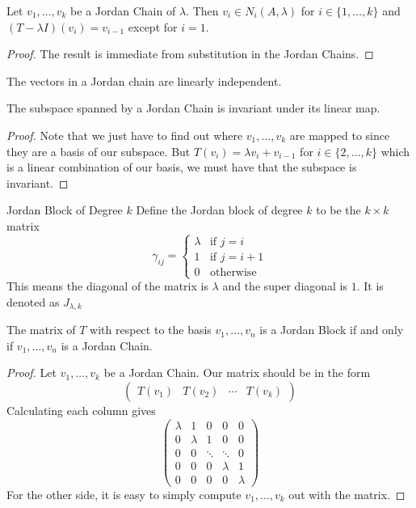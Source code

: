 \begin{crl}{}{} Let $v_1,\dots,v_k$ be a Jordan Chain of $\lambda$. Then $v_i\in N_i(A,\lambda)$ for $i\in\{1,\dots,k\}$ and $(T-\lambda I)(v_i)=v_{i-1}$ except for $i=1$. \tcbline
\begin{proof} The result is immediate from substitution in the Jordan Chains. 
\end{proof}
\end{crl}

\begin{prp}{}{} The vectors in a Jordan chain are linearly independent. 
\end{prp}

\begin{prp}{}{} The subspace spanned by a Jordan Chain is invariant under its linear map. \tcbline
\begin{proof} Note that we just have to find out where $v_1,\dots,v_k$ are mapped to since they are a basis of our subspace. But $T(v_i)=\lambda v_i+v_{i-1}$ for $i\in\{2,\dots,k\}$ which is a linear combination of our basis, we must have that the subspace is invariant. 
\end{proof}
\end{prp}

\begin{defn}{Jordan Block of Degree $k$}{} Define the Jordan block of degree $k$ to be the $k\times k$ matrix $$
\gamma_{ij}=\begin{cases}
\lambda & \text{if $j=i$}\\
1 & \text{if $j=i+1$}\\
0 & \text{otherwise}
\end{cases}$$
This means the diagonal of the matrix is $\lambda$ and the super diagonal is $1$. It is denoted as $J_{\lambda,k}$
\end{defn}

\begin{crl}{}{} The matrix of $T$ with respect to the basis $v_1,\dots,v_n$ is a Jordan Block if and only if $v_1,\dots,v_n$ is a Jordan Chain. \tcbline
\begin{proof} Let $v_1,\dots,v_k$ be a Jordan Chain. Our matrix should be in the form $$\begin{pmatrix}
T(v_1) & T(v_2) & \cdots & T(v_k) 
\end{pmatrix}$$ Calculating each column gives $$\begin{pmatrix}
\lambda & 1 & 0 & 0 & 0\\
0 & \lambda & 1 & 0 & 0\\
0 & 0 & \ddots & \ddots & 0\\
0 & 0 & 0 & \lambda & 1\\
0 & 0 & 0 & 0 & \lambda
\end{pmatrix}$$
For the other side, it is easy to simply compute $v_1,\dots,v_k$ out with the matrix. 
\end{proof}
\end{crl}

